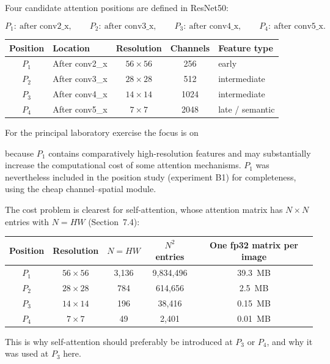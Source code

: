 \documentclass[11pt]{article}
\newcommand{\qbox}[1]{\begin{center}\fbox{\,#1\,}\end{center}}
\begin{document}
Four candidate attention positions are defined in ResNet50:

\[
P_1:\ \text{after conv2\_x},\qquad
P_2:\ \text{after conv3\_x},\qquad
P_3:\ \text{after conv4\_x},\qquad
P_4:\ \text{after conv5\_x}.
\]

\begin{center}
\small
\begin{tabular}{|c|l|c|c|l|}
\hline
Position & Location & Resolution & Channels & Feature type\\
\hline
$P_1$ & After conv2\_x & $56\times56$ & 256 & early\\
$P_2$ & After conv3\_x & $28\times28$ & 512 & intermediate\\
$P_3$ & After conv4\_x & $14\times14$ & 1024 & intermediate\\
$P_4$ & After conv5\_x & $7\times7$ & 2048 & late / semantic\\
\hline
\end{tabular}
\end{center}

For the principal laboratory exercise the focus is on

\qbox{$P_2,\quad P_3,\quad P_4$}

because $P_1$ contains comparatively high-resolution features and may
substantially increase the computational cost of some attention mechanisms.
$P_1$ was nevertheless included in the position study (experiment B1) for
completeness, using the cheap channel--spatial module.

The cost problem is clearest for self-attention, whose attention matrix has
$N\times N$ entries with $N=HW$ (Section~7.4):

\begin{center}
\small
\begin{tabular}{|c|c|c|c|c|}
\hline
Position & Resolution & $N=HW$ & $N^2$ entries & One fp32 matrix per image\\
\hline
$P_1$ & $56\times56$ & 3{,}136 & 9{,}834{,}496 & 39.3~MB\\
$P_2$ & $28\times28$ & 784 & 614{,}656 & 2.5~MB\\
$P_3$ & $14\times14$ & 196 & 38{,}416 & 0.15~MB\\
$P_4$ & $7\times7$ & 49 & 2{,}401 & 0.01~MB\\
\hline
\end{tabular}
\end{center}

This is why self-attention should preferably be introduced at $P_3$ or $P_4$,
and why it was used at $P_3$ here.
\end{document}
